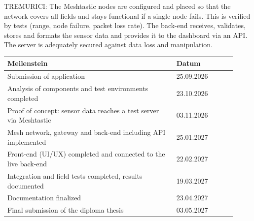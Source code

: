 TREMURICI: The Meshtastic nodes are configured and placed so that the network covers all fields and stays functional if a single node fails. This is verified by tests (range, node failure, packet loss rate). The back-end receives, validates, stores and formats the sensor data and provides it to the dashboard via an API. The server is adequately secured against data loss and manipulation.



\begin{tabular}{@{}p{0.68\linewidth}p{0.24\linewidth}@{}}
    \toprule
    \bfseries Meilenstein & \bfseries Datum \\
    \midrule
    Submission of application	& 25.09.2026 \\
    Analysis of components and test environments completed	& 23.10.2026 \\
    Proof of concept: sensor data reaches a test server via Meshtastic	& 03.11.2026 \\
    Mesh network, gateway and back-end including API implemented	& 25.01.2027 \\
    Front-end (UI/UX) completed and connected to the live back-end	& 22.02.2027 \\
    Integration and field tests completed, results documented	& 19.03.2027 \\
    Documentation finalized	& 23.04.2027 \\
    Final submission of the diploma thesis	& 03.05.2027 \\
  \bottomrule
\end{tabular}
